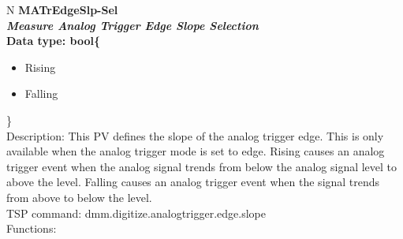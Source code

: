 \documentclass[openany]{article}
\begin{document}
		\begin{tabular}{N}
			\hline
			\bfseries MATrEdgeSlp-Sel\label{pv:matredgeslp-sel} \\ \hline
			\emph{Measure Analog Trigger Edge Slope Selection} \\
			Data type: bool\{\begin{itemize}[noitemsep]
				\small
				\item[] Rising
				\item[] Falling
			\end{itemize}\} \\
			Description: This PV defines the slope of the analog trigger edge. This is only available when the analog trigger mode is set to edge. Rising causes an analog trigger event when the analog signal trends from below the analog signal
level to above the level. Falling causes an analog trigger event when the signal trends from above to below the level. \\
			TSP command: dmm.digitize.analogtrigger.edge.slope \\
			Functions: \\
			\arrayrulecolor{\FuncTableBorderColor}

		\end{tabular}
\end{document}
